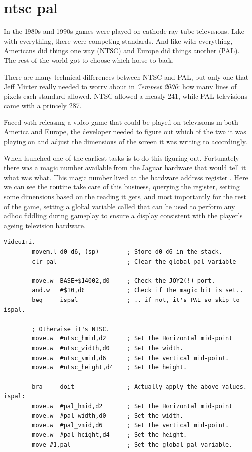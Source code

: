 \chapter{ntsc pal}
\label{sec:ntsc_pal}
\lhead[tempest 2000]{}
\lstset{style=68KStyle}
\vspace{0.8cm}

In the 1980s and 1990s games were played on cathode ray tube televisions. Like
with everything, there were competing standards. And like with everything, Americans
did things one way (NTSC) and Europe did things another (PAL). The rest of the world
got to choose which horse to back.

There are many technical differences between NTSC and PAL, but only one that Jeff Minter
really needed to worry about in \textit{Tempest 2000}: how many lines of pixels each
standard allowed. NTSC allowed a measly 241, while PAL televisions came with a princely 287.

Faced with releasing a video game that could be played on televisions in both America and Europe, 
the developer needed to figure out which of the two it was playing on and adjust the dimensions
of the screen it was writing to accordingly.

When launched one of the earliest tasks is to do this figuring out. Fortunately there was a 
magic number available from the Jaguar hardware that would tell it what was what. This magic
number lived at the hardware address register . Here we can see the 
routine take care of this business, querying the register, setting some dimensions based on the
reading it gets, and most importantly for the rest of the game, setting a global variable called
 that can be used to perform any adhoc fiddling during gameplay to ensure a display
consistent with the player's ageing television hardware.

\clearpage
\begin{lstlisting}
VideoIni:
        movem.l d0-d6,-(sp)        ; Store d0-d6 in the stack.
        clr pal                    ; Clear the global pal variable
    
        move.w  BASE+$14002,d0     ; Check the JOY2(!) port.
        and.w   #$10,d0            ; Check if the magic bit is set..
        beq     ispal              ; .. if not, it's PAL so skip to ispal.
    
        ; Otherwise it's NTSC.
        move.w  #ntsc_hmid,d2      ; Set the Horizontal mid-point
        move.w  #ntsc_width,d0     ; Set the width.
        move.w  #ntsc_vmid,d6      ; Set the vertical mid-point.
        move.w  #ntsc_height,d4    ; Set the height.
    
        bra     doit               ; Actually apply the above values.
ispal:
        move.w  #pal_hmid,d2       ; Set the Horizontal mid-point
        move.w  #pal_width,d0      ; Set the width.
        move.w  #pal_vmid,d6       ; Set the vertical mid-point.
        move.w  #pal_height,d4     ; Set the height.
        move #1,pal                ; Set the global pal variable.
\end{lstlisting}

